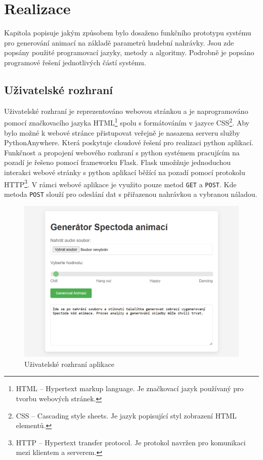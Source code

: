 \section{Realizace} \label{sec:Realizace}

Kapitola popisuje jakým způsobem bylo dosaženo funkčního prototypu systému pro generování animací na základě parametrů hudební nahrávky. Jsou zde popsány použité programovací jazyky, metody a algoritmy. Podrobně je popsáno programové řešení jednotlivých částí systému. 

\subsection{Uživatelské rozhraní}

Uživatelské rozhraní je reprezentováno webovou stránkou a je naprogramováno pomocí značkovacího jazyka \acs{HTML}\footnote{HTML -- Hypertext markup language. Je značkovací jazyk používaný pro tvorbu webových stránek.} spolu s formátováním v jazyce \acs{CSS}\footnote{CSS -- Cascading style sheets. Je jazyk popisující styl zobrazení HTML elementů\cite{CSS}.}. Aby bylo možné k webové stránce přistupovat veřejně je nasazena serveru služby PythonAnywhere. Která poskytuje cloudové řešení pro realizaci python aplikací. Funkčnost a propojení webového rozhraní s python systémem pracujícím na pozadí je řešeno pomocí frameworku Flask. Flask umožňuje jednoduchou interakci webové stránky s python aplikací běžící na pozadí pomocí protokolu HTTP\footnote{HTTP -- Hypertext transfer protocol. Je protokol navržen pro komunikaci mezi klientem a serverem.}. V rámci webové aplikace je využito pouze metod \texttt{GET} a \texttt{POST}. Kde metoda \texttt{POST} slouží pro odeslání dat s přiřazenou nahrávkou a vybranou náladou.

\begin{figure}[H]
    \centering
    \includegraphics[width = 1\linewidth]{obrazky/Uzivatelske_rozhrani.png}
    \caption{Uživatelské rozhraní aplikace}
    \label{fig:Uzivatelske_rozhrani}
\end{figure}

